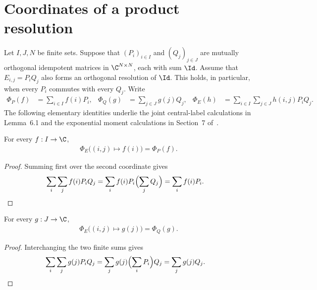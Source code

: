 \section{Coordinates of a product resolution}
\label{sec:orthogonal_resolution_product_coordinates}

Let $I,J,N$ be finite sets. Suppose that
$(P_i)_{i\in I}$ and $(Q_j)_{j\in J}$ are mutually orthogonal
idempotent matrices in $\C^{N\times N}$, each with sum $\Id$.
Assume that $E_{i,j}=P_iQ_j$ also forms an orthogonal resolution of
$\Id$. This holds, in particular, when every $P_i$ commutes with every
$Q_j$. Write
\begin{align*}
  \Phi_P(f)&=\sum_{i\in I}f(i)P_i,&
  \Phi_Q(g)&=\sum_{j\in J}g(j)Q_j,&
  \Phi_E(h)&=\sum_{i\in I}\sum_{j\in J}h(i,j)P_iQ_j.
\end{align*}
The following elementary identities underlie the joint central-label
calculations in Lemma~6.1 and the exponential moment calculations in
Section~7 of~\cite{OpenAI2026AreaLaw}.

\begin{theorem}
  \label{thm:orthogonal_resolution_product_first}
  \leanok
  For every $f:I\to\C$,
  \begin{align*}
    \Phi_E\bigl((i,j)\mapsto f(i)\bigr)=\Phi_P(f).
  \end{align*}
\end{theorem}

\begin{proof}
  \leanok
  Summing first over the second coordinate gives
  \begin{align*}
    \sum_i\sum_j f(i)P_iQ_j
      &=\sum_i f(i)P_i\Bigl(\sum_jQ_j\Bigr)
       =\sum_i f(i)P_i.
  \end{align*}
\end{proof}

\begin{theorem}
  \label{thm:orthogonal_resolution_product_second}
  \leanok
  For every $g:J\to\C$,
  \begin{align*}
    \Phi_E\bigl((i,j)\mapsto g(j)\bigr)=\Phi_Q(g).
  \end{align*}
\end{theorem}

\begin{proof}
  \leanok
  Interchanging the two finite sums gives
  \begin{align*}
    \sum_i\sum_j g(j)P_iQ_j
      &=\sum_j g(j)\Bigl(\sum_iP_i\Bigr)Q_j
       =\sum_j g(j)Q_j.
  \end{align*}
\end{proof}
